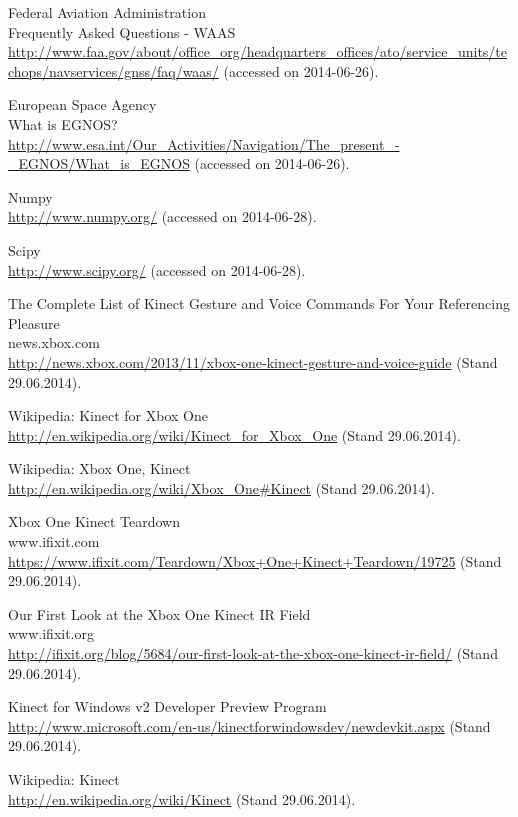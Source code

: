 \documentclass[12pt,a4paper,ngerman]{scrartcl}
\begin{document}
\begin{thebibliography}{99}
Federal Aviation Administration\\
Frequently Asked Questions - WAAS\\
\url{http://www.faa.gov/about/office_org/headquarters_offices/ato/service_units/techops/navservices/gnss/faq/waas/} (accessed on 2014-06-26).

European Space Agency\\
What is EGNOS?
\url{http://www.esa.int/Our_Activities/Navigation/The_present_-_EGNOS/What_is_EGNOS} (accessed on 2014-06-26).

Numpy\\
\url{http://www.numpy.org/} (accessed on 2014-06-28).

Scipy\\
\url{http://www.scipy.org/} (accessed on 2014-06-28).

The Complete List of Kinect Gesture and Voice Commands For Your Referencing Pleasure\\
news.xbox.com\\
\url{http://news.xbox.com/2013/11/xbox-one-kinect-gesture-and-voice-guide} (Stand 29.06.2014).

Wikipedia: Kinect for Xbox One\\
\url{http://en.wikipedia.org/wiki/Kinect_for_Xbox_One} (Stand 29.06.2014).

Wikipedia: Xbox One, Kinect\\
\url{http://en.wikipedia.org/wiki/Xbox_One#Kinect} (Stand 29.06.2014).

Xbox One Kinect Teardown\\
www.ifixit.com\\
\url{https://www.ifixit.com/Teardown/Xbox+One+Kinect+Teardown/19725} (Stand 29.06.2014).

Our First Look at the Xbox One Kinect IR Field\\
www.ifixit.org\\
\url{http://ifixit.org/blog/5684/our-first-look-at-the-xbox-one-kinect-ir-field/} (Stand 29.06.2014).

Kinect for Windows v2 Developer Preview Program\\
\url{http://www.microsoft.com/en-us/kinectforwindowsdev/newdevkit.aspx} (Stand 29.06.2014).

Wikipedia: Kinect\\
\url{http://en.wikipedia.org/wiki/Kinect} (Stand 29.06.2014).


\end{thebibliography}
\end{document}
